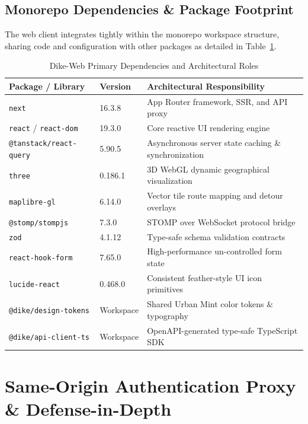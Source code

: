 \documentclass[conference,10pt,a4paper]{IEEEtran}
\begin{document}
\subsection{Monorepo Dependencies \& Package Footprint}
The web client integrates tightly within the monorepo workspace structure, sharing code and configuration with other packages as detailed in Table~\ref{tab:web_deps}.

\begin{table}[!ht]
\caption{Dike-Web Primary Dependencies and Architectural Roles}
\label{tab:web_deps}
\centering
\scriptsize
\begin{tabularx}{\columnwidth}{p{2.8cm}p{1.4cm}X}
\toprule
\textbf{Package / Library} & \textbf{Version} & \textbf{Architectural Responsibility} \\
\midrule
\texttt{next} & 16.3.8 & App Router framework, SSR, and API proxy \\
\texttt{react} / \texttt{react-dom} & 19.3.0 & Core reactive UI rendering engine \\
\texttt{@tanstack/react-query} & 5.90.5 & Asynchronous server state caching \& synchronization \\
\texttt{three} & 0.186.1 & 3D WebGL dynamic geographical visualization \\
\texttt{maplibre-gl} & 6.14.0 & Vector tile route mapping and detour overlays \\
\texttt{@stomp/stompjs} & 7.3.0 & STOMP over WebSocket protocol bridge \\
\texttt{zod} & 4.1.12 & Type-safe schema validation contracts \\
\texttt{react-hook-form} & 7.65.0 & High-performance un-controlled form state \\
\texttt{lucide-react} & 0.468.0 & Consistent feather-style UI icon primitives \\
\texttt{@dike/design-tokens} & Workspace & Shared Urban Mint color tokens \& typography \\
\texttt{@dike/api-client-ts} & Workspace & OpenAPI-generated type-safe TypeScript SDK \\
\bottomrule
\end{tabularx}
\end{table}

\section{Same-Origin Authentication Proxy \& Defense-in-Depth}
\end{document}

